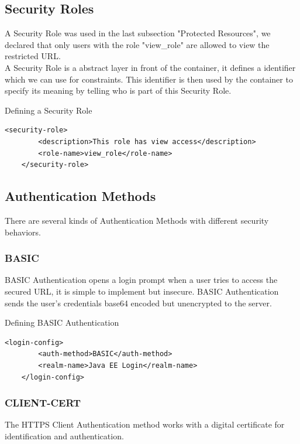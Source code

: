 \documentclass[12pt,a4paper]{report}
\begin{document}
\subsection{Security Roles}
A Security Role was used in the last subsection "Protected Resources", we declared that only users with the role "view\_role" are allowed to view the restricted URL.\\
A Security Role is a abstract layer in front of the container, it defines a identifier which we can use for constraints. This identifier is then used by the container to specify its meaning by telling who is part of this Security Role.\\
\begin{bclogo}[couleur=yellow!15,arrondi=0.1,logo=\bccrayon, ombre = true]{Defining a Security Role}
\begin{lstlisting}[style=XML]
    <security-role>
	    <description>This role has view access</description>
	    <role-name>view_role</role-name>
    </security-role>
\end{lstlisting}
\end{bclogo}
\newpage
\subsection{Authentication Methods}
There are several kinds of Authentication Methods with different security behaviors.\\
\subsubsection*{BASIC}
BASIC Authentication opens a login prompt when a user tries to access the secured URL, it is simple to implement but insecure. BASIC Authentication sends the user's credentials base64 encoded but unencrypted to the server.\\
\begin{bclogo}[couleur=yellow!15,arrondi=0.1,logo=\bccrayon, ombre = true]{Defining BASIC Authentication}
\begin{lstlisting}[style=XML]
    <login-config>
	    <auth-method>BASIC</auth-method>
	    <realm-name>Java EE Login</realm-name>
    </login-config>
\end{lstlisting}
\end{bclogo}
\subsubsection*{CLIENT-CERT}
The HTTPS Client Authentication method works with a digital certificate for identification and authentication.
\end{document}
